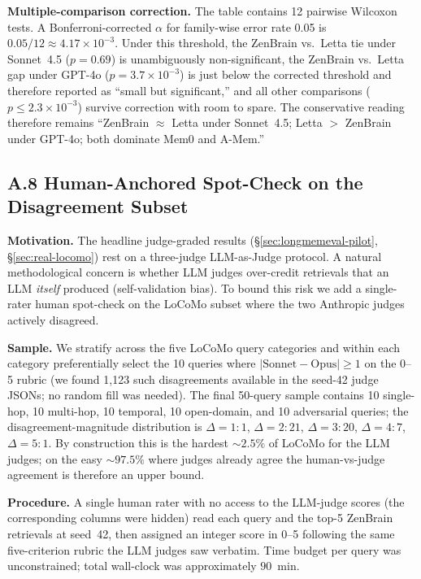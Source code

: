 \documentclass{article}
\begin{document}
\textbf{Multiple-comparison correction.}
The table contains 12 pairwise Wilcoxon tests. A Bonferroni-corrected
$\alpha$ for family-wise error rate 0.05 is $0.05/12 \approx 4.17 \times 10^{-3}$.
Under this threshold, the ZenBrain vs.\ Letta tie under
Sonnet~4.5 ($p = 0.69$) is unambiguously non-significant,
the ZenBrain vs.\ Letta gap under GPT-4o
($p = 3.7 \times 10^{-3}$) is just below the corrected threshold
and therefore reported as ``small but significant,'' and all other
comparisons ($p \leq 2.3 \times 10^{-3}$) survive correction with
room to spare. The conservative reading therefore remains
``ZenBrain $\approx$ Letta under Sonnet~4.5;
Letta $>$ ZenBrain under GPT-4o; both dominate Mem0
and A-Mem.''

\subsection*{A.8 Human-Anchored Spot-Check on the Disagreement Subset}
\label{app:human-spotcheck}

\textbf{Motivation.} The headline judge-graded results
(\S\ref{sec:longmemeval-pilot}, \S\ref{sec:real-locomo}) rest on a
three-judge LLM-as-Judge protocol. A natural methodological concern
is whether LLM judges over-credit retrievals that an LLM
\emph{itself} produced (self-validation bias). To bound this risk
we add a single-rater human spot-check on the LoCoMo subset where
the two Anthropic judges actively disagreed.

\textbf{Sample.} We stratify across the five LoCoMo query categories
and within each category preferentially select the 10 queries where
$|\text{Sonnet}-\text{Opus}| \geq 1$ on the 0--5 rubric (we found
1{,}123 such disagreements available in the seed-42 judge JSONs;
no random fill was needed). The final 50-query sample contains
10 single-hop, 10 multi-hop, 10 temporal, 10 open-domain, and 10
adversarial queries; the disagreement-magnitude distribution is
$\Delta=1{:}1$, $\Delta=2{:}21$, $\Delta=3{:}20$, $\Delta=4{:}7$,
$\Delta=5{:}1$. By construction this is the hardest
$\sim\!2.5\%$ of LoCoMo for the LLM judges; on the easy
$\sim\!97.5\%$ where judges already agree the human-vs-judge
agreement is therefore an upper bound.

\textbf{Procedure.} A single human rater with no access to the
LLM-judge scores (the corresponding columns were hidden) read each
query and the top-5 ZenBrain retrievals at seed~42, then assigned an
integer score in 0--5 following the same five-criterion rubric the
LLM judges saw verbatim. Time budget per query was unconstrained;
total wall-clock was approximately $90$~min.
\end{document}
